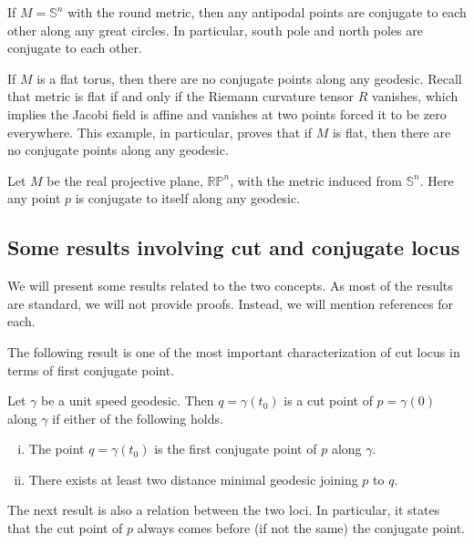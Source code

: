 \begin{eg}
    If $M=\mathbb{S}^n$ with the round metric, then any antipodal points are conjugate to each other along any great circles. In particular, south pole and north poles are conjugate to each other.
\end{eg}

\begin{eg}\label{eg:ConugatePointsonTorus}
    If $M$ is a flat torus, then there are no conjugate points along any geodesic. Recall that metric is flat if and only if the Riemann curvature tensor $R$ vanishes, which implies the Jacobi field is affine and vanishes at two points forced it to be zero everywhere. This example, in particular, proves that if $M$ is flat, then there are no conjugate points along any geodesic.
\end{eg}
\begin{eg}
    Let $M$ be the real projective plane, $\mathbb{RP}^n$, with the metric induced from $\mathbb{S}^n$. Here any point $p$ is conjugate to itself along any geodesic.   
\end{eg}


\subsection{Some results involving cut and conjugate locus}
\hfb We will present some results related to the two concepts. As most of the results are standard, we will not provide proofs. Instead, we will mention references for each.

\vspace{0.3cm}
\hf The following result is one of the most important characterization of cut locus in terms of first conjugate point.
\begin{thm}\cite[Chapter 3, Proposition 4.1]{Sak96}\label{thm:CharacterizationOfCutLocusInTermsOfConjugatePoint}
    Let $\gamma$ be a unit speed geodesic. Then $q=\gamma(t_0)$ is a cut point of $p=\gamma(0)$ along $\gamma$ if either of the following holds.
    \begin{enumerate}[(i)]
        \item The point $q=\gamma(t_0)$  is the first conjugate point of $p$ along $\gamma$.
        \item There exists at least two distance minimal geodesic joining $p$ to $q$.
    \end{enumerate}
\end{thm}
\vspace{0.3cm}
\noindent The next result is also a relation between the two loci. In particular, it states that the cut point of $p$ always comes before (if not the same) the conjugate point.


